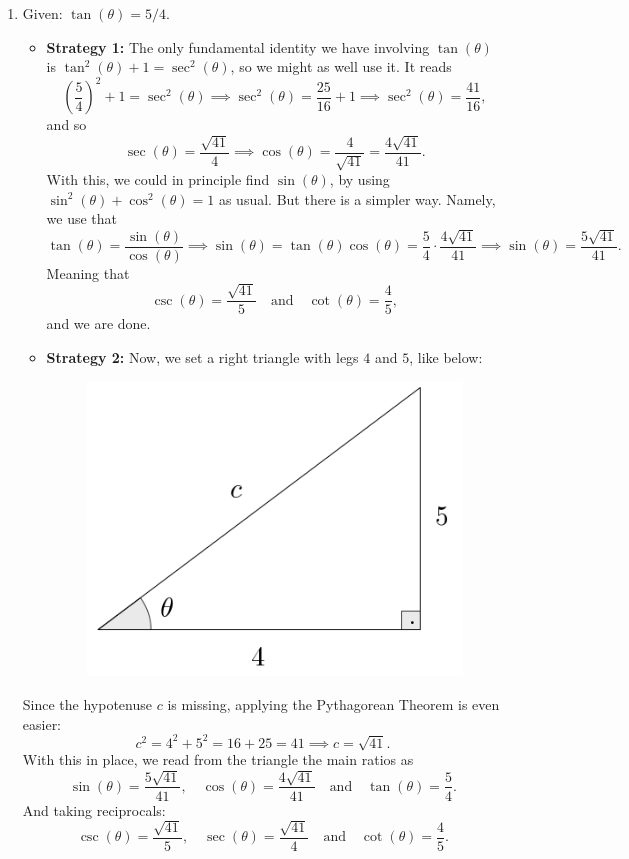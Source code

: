 \documentclass{ximera}
\begin{document}
\begin{example}
\begin{enumerate}[label=\alph*.]
  \item Given: $\tan(\theta) = 5/4$.

    \begin{explanation}
      \begin{itemize}
      \item {\bf Strategy 1:} The only fundamental identity we have involving $\tan(\theta)$ is $\tan^2(\theta)+1=\sec^2(\theta)$, so we might as well use it. It reads $$\left(\frac{5}{4}\right)^2 + 1 = \sec^2(\theta) \implies \sec^2(\theta) = \frac{25}{16} + 1 \implies \sec^2(\theta) = \frac{41}{16},$$and so $$\sec(\theta) = \frac{\sqrt{41}}{4} \implies \cos(\theta) = \frac{4}{\sqrt{41}} = \frac{4\sqrt{41}}{41}.$$With this, we could in principle find $\sin(\theta)$, by using $\sin^2(\theta)+\cos^2(\theta)=1$ as usual. But there is a simpler way. Namely, we use that $$\tan(\theta) = \frac{\sin(\theta)}{\cos(\theta)} \implies \sin(\theta) = \tan(\theta) \cos(\theta)= \frac{5}{4}\cdot \frac{4\sqrt{41}}{41} \implies \sin(\theta) = \frac{5\sqrt{41}}{41}.$$Meaning that $$\csc(\theta) = \frac{\sqrt{41}}{5} \quad\mbox{and}\quad \cot(\theta) = \frac{4}{5},$$and we are done.
      \item {\bf Strategy 2:} Now, we set a right triangle with legs $4$ and $5$, like below:  \begin{figure}[h]
          \centering
          \includegraphics[scale=.3]{./figures/9-1-3-triangle-tan-5-4.png}
        \end{figure} 
      \end{itemize} Since the hypotenuse $c$ is missing, applying the Pythagorean Theorem is even easier: $$c^2 = 4^2+5^2 = 16+25=41\implies c=\sqrt{41}.$$With this in place, we read from the triangle the main ratios as $$\sin(\theta)=\frac{5\sqrt{41}}{41},\quad \cos(\theta)=\frac{4\sqrt{41}}{41}\quad\mbox{and}\quad\tan(\theta)=\frac{5}{4}.$$And taking reciprocals:$$\csc(\theta)=\frac{\sqrt{41}}{5},\quad \sec(\theta)=\frac{\sqrt{41}}{4}\quad\mbox{and}\quad\cot(\theta)=\frac{4}{5}.$$
    \end{explanation}
    

\end{enumerate}
\end{example}
\end{document}
